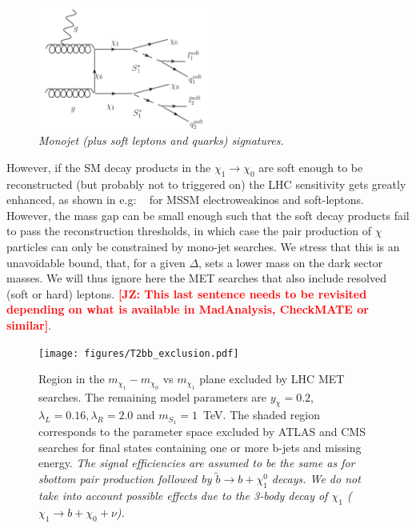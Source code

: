 \documentclass[11pt]{cernrep}
\def\JZ#1{{\bf  \textcolor{red}{[JZ: {#1}]}}}
\begin{document}
 \begin{figure}[!htp]
  \centering
  \includegraphics[width=0.5\textwidth]{./figures/MonoJet.png} 
  \caption{\it Monojet (plus soft leptons and quarks) signatures.}
\label{fig:MonoJet}
\end{figure}

However, if the SM decay products in the $\chi_1 \to \chi_0$ are soft enough to be reconstructed (but probably not to triggered on) the LHC sensitivity gets greatly enhanced, as shown in e.g: ~\cite{Schwaller:2013baa} for MSSM electroweakinos and soft-leptons. However, the mass gap can be small enough such that the soft decay products fail to pass the reconstruction thresholds, in which case the pair production of $\chi$ particles can only be constrained by  mono-jet searches. We stress that this is an unavoidable bound, that, for a given $\Delta$, sets a lower mass on the dark sector masses. We will thus ignore here the MET searches that also include resolved (soft or hard) leptons. \JZ{This last sentence needs to be revisited depending on what is available in MadAnalysis, CheckMATE or similar}.



\begin{figure}[!h]
	\centering
	\texttt{[image: figures/T2bb\_exclusion.pdf]}
	\caption{Region in the $m_{\chi_1} - m_{\chi_0}$ vs $m_{\chi_1}$ plane excluded by LHC MET searches. The remaining model parameters are $y_{\chi} = 0.2$, $\lambda_L = 0.16, \lambda_R = 2.0$ and $m_{S_1} = 1$~TeV. The shaded region corresponds to the parameter space excluded by ATLAS and CMS searches for final states containing one or more b-jets and missing energy. {\it The signal efficiencies are assumed to be the same as for sbottom pair production followed by $\tilde{b} \to b + \chi_1^0$ decays. We do not take into account possible effects due to the 3-body decay of $\chi_1$ ($\chi_1 \to b + \chi_0 + \nu$).}
		\label{fig:T2bbexcl}
	}
\end{figure}
\end{document}
